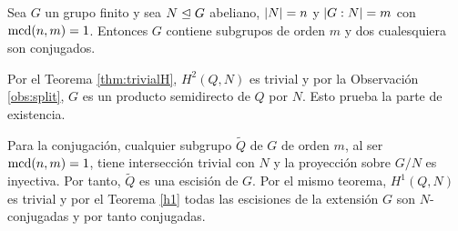 \begin{teorema}\label{thmschurab} Sea $G$ un grupo finito y sea $N \trianglelefteq G$ abeliano, $\left|N\right|=n$ y $\left|G:N\right|=m$ con $\operatorname{mcd}(n,m)=1$. Entonces $G$ contiene subgrupos de orden $m$ y dos cualesquiera son conjugados.
	\begin{demostracion}
%		
%		

		Por el Teorema \ref{thm:trivialH}, $H^2(Q,N)$ es trivial y por la Observación \ref{obs:split}, $G$ es un producto semidirecto de $Q$ por $N$. Esto prueba la parte de existencia.
		
		Para la conjugación, cualquier subgrupo $\tilde Q$ de $G$ de orden $m$, al ser $\operatorname{mcd}(n,m)=1$, tiene intersección trivial con $N$ y la proyección sobre $G/N$ es inyectiva. Por tanto, $\tilde Q$ es una escisión de $G$. Por el mismo teorema, $H^1(Q,N)$ es trivial y por el Teorema \ref{h1} todas las escisiones de la extensión $G$ son $N$-conjugadas y por tanto conjugadas. 
	\end{demostracion}
\end{teorema}